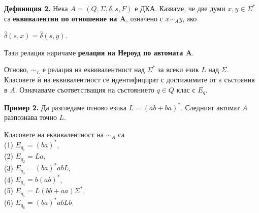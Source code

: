 \documentclass{article}
\begin{document}
    \vspace{15pt}

    \textbf{Дефиниция 2.} Нека $A = (Q,\Sigma,\delta,s,F)$ е ДКА. Казваме, че две думи 
    $x,y \in \Sigma^*$ са \textbf{еквивалентни по отношение на $\boldsymbol{A}$}, 
    означено с $x \sim_A y$, ако 
    \begin{center}
        $\hat{\delta}(s,x) = \hat{\delta}(s,y)$.
    \end{center}
    Тази релация наричаме \textbf{релация на Нероуд по автомата $\boldsymbol{A}$}.
    
    \vspace{5pt}

    Отново, $\sim_L$ е релация на еквивалентност над $\Sigma^*$ за всеки език $L$ над
    $\Sigma$. Класовете ѝ на еквивалентност се идентифицират с достижимите от $s$
    състояния в $A$. Означаваме съответстващия на състоянието $q \in Q$ клас с $E_q$.

    \vspace{45pt}

    \textbf{Пример 2.} Да разгледаме отново езика $L = (ab + ba)^*$. Следният автомат
    $A$ разпознава точно $L$.
    \begin{center}
    \end{center}

    Класовете на еквивалентност на $\sim_A$ са \\
    (1) $E_{q_1} = (ba)^*$, \\
    (2) $E_{q_2} = La$, \\
    (3) $E_{q_3} = (ba)^*abL$, \\
    (4) $E_{q_4} = b(ab)^*$, \\
    (5) $E_{q_5} = L(bb + aa)\Sigma^*$, \\
    (6) $E_{q_6} = (ba)^*abLb$.
\end{document}
